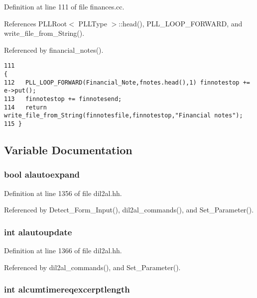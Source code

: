 Definition at line 111 of file finances.cc.

References PLLRoot$<$ PLLType $>$::head(), PLL\_\-LOOP\_\-FORWARD, and write\_\-file\_\-from\_\-String().

Referenced by financial\_\-notes().



\footnotesize\begin{verbatim}111                                                                                                               {
112   PLL_LOOP_FORWARD(Financial_Note,fnotes.head(),1) finnotestop += e->put();
113   finnotestop += finnotesend;
114   return write_file_from_String(finnotesfile,finnotestop,"Financial notes");
115 }
\end{verbatim}\normalsize 


\subsection{Variable Documentation}
\subsubsection{\setlength{\rightskip}{0pt plus 5cm}bool alautoexpand}\label{dil2al_8hh_a162}




Definition at line 1356 of file dil2al.hh.

Referenced by Detect\_\-Form\_\-Input(), dil2al\_\-commands(), and Set\_\-Parameter().
\subsubsection{\setlength{\rightskip}{0pt plus 5cm}int alautoupdate}\label{dil2al_8hh_a172}




Definition at line 1366 of file dil2al.hh.

Referenced by dil2al\_\-commands(), and Set\_\-Parameter().
\subsubsection{\setlength{\rightskip}{0pt plus 5cm}int alcumtimereqexcerptlength}\label{dil2al_8hh_a164}





